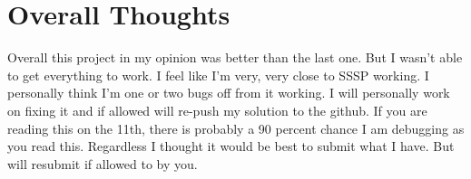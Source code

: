 \documentclass[letterpaper, 10pt]{article}
\begin{document}
\section{Overall Thoughts}
Overall this project in my opinion was better than the last one. But I wasn't able to get everything to work. I feel like I'm very, very close to SSSP working. I personally think I'm one or two bugs off from it working. I will personally work on fixing it and if allowed will re-push my solution to the github. If you are reading this on the 11th, there is probably a 90 percent chance I am debugging as you read this. Regardless I thought it would be best to submit what I have. But will resubmit if allowed to by you.
\end{document}
